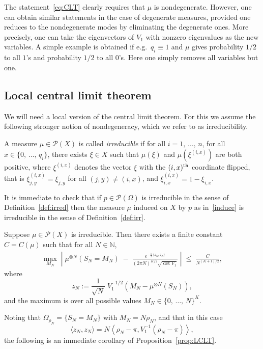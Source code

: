\documentclass[AHL,Unicode,longabstracts,published]{cedram}
\renewcommand{\leq}{\;\leqslant\;}
\newcommand{\scalar}[2]{\langle #1, #2\rangle}
\newcommand{\cP}{\mathcal{P}}
\newcommand{\bbN}{\mathbb{N}}
\let\r=\rho
\let\O=\Omega
\begin{document}
The statement~\eqref{eq:CLT} clearly requires that $\mu$ is nondegenerate. However, one can obtain similar statements in the case of degenerate measures, provided one reduces to the nondegenerate modes by eliminating the degenerate ones. More precisely, one can take the eigenvectors of $V_1$ with nonzero eigenvalues as the new variables. A simple example is obtained if e.g.\ $q_i\equiv 1$ and $\mu$ gives probability $1/2$ to all $1$'s and probability $1/2$ to all $0$'s. Here one simply removes all variables but one.

\subsection{Local central limit theorem}

We will need a local version of the central limit theorem. For this we assume the following stronger notion of nondegeneracy, which we refer to as irreducibility.

\begin{defi}\label{def:irr}
A measure $\mu\in\cP(X)$ is called \emph{irreducible} if for all $i=1,\,\dots, \,n$, for all $x\in\{0,\,\dots,\,q_i\}$, there exists $\xi\in X$ such that $\mu(\xi)$ and $\mu(\xi^{(i,x)})$ are both positive, where $\xi^{(i,x)}$ denotes the vector $\xi$ with the $(i,x)^{\rm th}$ coordinate flipped, that is $\xi^{(i,x)}_{j,y}=\xi_{j,y}$ for all $(j,y)\neq (i,x)$, and $\xi^{(i,x)}_{i,x}=1-\xi_{i,x}$.
\end{defi}

It is immediate to check that if $p\in\cP(\O)$ is irreducible in the sense of Definition~\ref{def:irred} then the measure $\mu$ induced on $X$ by $p$ as in~\eqref{induce} is irreducible in the sense of Definition~\ref{def:irr}.

\begin{prop}\label{prop:LCLT}
Suppose $\mu\in\cP(X)$ is irreducible. Then there exists a finite constant $C=C(\mu)$ such that for all $N\in\bbN$,
\begin{align}\label{eq:LCLT}
\max_{M_N}\;
\left |\;\mu^{\otimes N}\left(S_N=M_N\right) \;-\; \frac{e^{-\frac12\,\scalar{z_N}{z_N}}}{(2\pi N) ^{K/2}
\sqrt {\det V_1} }\;
\right| \leq \frac{C}{ N^{(K+1)/2}},
\end{align}
where
\[
z_N:=\frac1{\sqrt N} \;V_1^{-1/2}\left(M_N - \mu^{\otimes N}(S_N)\right),
\]
and the maximum is over all possible values $M_N\in\{0,\,\dots,\,N\}^K$.
\end{prop}
Noting that $\O_{\r_N}=\{S_N=M_N\}$ with $M_N=N\r_N$, and that in this case
\[
\scalar{z_N}{z_N}
= N \left\langle\r_N-\pi,V_1^{-1}(\r_N-\pi)\right\rangle,
\]
the following is an immediate corollary of Proposition~\ref{prop:LCLT}.
\end{document}

